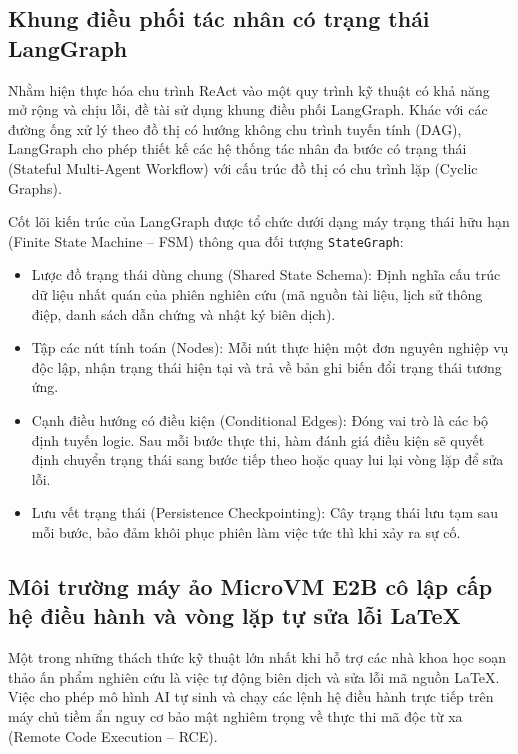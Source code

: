\subsection{Khung điều phối tác nhân có trạng thái LangGraph}
\label{subsec:langgraph_orchestration}
Nhằm hiện thực hóa chu trình ReAct vào một quy trình kỹ thuật có khả năng mở rộng và chịu lỗi, đề tài sử dụng khung điều phối LangGraph. Khác với các đường ống xử lý theo đồ thị có hướng không chu trình tuyến tính (DAG), LangGraph cho phép thiết kế các hệ thống tác nhân đa bước có trạng thái (Stateful Multi-Agent Workflow) với cấu trúc đồ thị có chu trình lặp (Cyclic Graphs).

Cốt lõi kiến trúc của LangGraph được tổ chức dưới dạng máy trạng thái hữu hạn (Finite State Machine -- FSM) thông qua đối tượng \texttt{StateGraph}:
\begin{itemize}
    \item Lược đồ trạng thái dùng chung (Shared State Schema): Định nghĩa cấu trúc dữ liệu nhất quán của phiên nghiên cứu (mã nguồn tài liệu, lịch sử thông điệp, danh sách dẫn chứng và nhật ký biên dịch).
    \item Tập các nút tính toán (Nodes): Mỗi nút thực hiện một đơn nguyên nghiệp vụ độc lập, nhận trạng thái hiện tại và trả về bản ghi biến đổi trạng thái tương ứng.
    \item Cạnh điều hướng có điều kiện (Conditional Edges): Đóng vai trò là các bộ định tuyến logic. Sau mỗi bước thực thi, hàm đánh giá điều kiện sẽ quyết định chuyển trạng thái sang bước tiếp theo hoặc quay lui lại vòng lặp để sửa lỗi.
    \item Lưu vết trạng thái (Persistence Checkpointing): Cây trạng thái lưu tạm sau mỗi bước, bảo đảm khôi phục phiên làm việc tức thì khi xảy ra sự cố.
\end{itemize}

\subsection{Môi trường máy ảo MicroVM E2B cô lập cấp hệ điều hành và vòng lặp tự sửa lỗi LaTeX}
\label{subsec:e2b_microvm_latex}
Một trong những thách thức kỹ thuật lớn nhất khi hỗ trợ các nhà khoa học soạn thảo ấn phẩm nghiên cứu là việc tự động biên dịch và sửa lỗi mã nguồn LaTeX. Việc cho phép mô hình AI tự sinh và chạy các lệnh hệ điều hành trực tiếp trên máy chủ tiềm ẩn nguy cơ bảo mật nghiêm trọng về thực thi mã độc từ xa (Remote Code Execution -- RCE).


